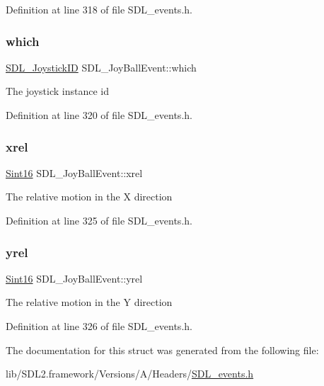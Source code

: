 Definition at line 318 of file S\+D\+L\+\_\+events.\+h.

\mbox{\label{struct_s_d_l___joy_ball_event_a4e2e185717d529167cd0bea21093c454}} 
\subsubsection{\texorpdfstring{which}{which}}
{\footnotesize\ttfamily \mbox{\hyperlink{_s_d_l__joystick_8h_a3c3d32500cb08f76ee8077983912c0bd}{S\+D\+L\+\_\+\+Joystick\+ID}} S\+D\+L\+\_\+\+Joy\+Ball\+Event\+::which}

The joystick instance id 

Definition at line 320 of file S\+D\+L\+\_\+events.\+h.

\mbox{\label{struct_s_d_l___joy_ball_event_a959a8473aa1964e5e1778c27a9ffd261}} 
\subsubsection{\texorpdfstring{xrel}{xrel}}
{\footnotesize\ttfamily \mbox{\hyperlink{_s_d_l__stdinc_8h_a9d0257032c0e146ab6121bf0122712f5}{Sint16}} S\+D\+L\+\_\+\+Joy\+Ball\+Event\+::xrel}

The relative motion in the X direction 

Definition at line 325 of file S\+D\+L\+\_\+events.\+h.

\mbox{\label{struct_s_d_l___joy_ball_event_a28ad48a9eb7a5d3ff62ccba09fcead76}} 
\subsubsection{\texorpdfstring{yrel}{yrel}}
{\footnotesize\ttfamily \mbox{\hyperlink{_s_d_l__stdinc_8h_a9d0257032c0e146ab6121bf0122712f5}{Sint16}} S\+D\+L\+\_\+\+Joy\+Ball\+Event\+::yrel}

The relative motion in the Y direction 

Definition at line 326 of file S\+D\+L\+\_\+events.\+h.



The documentation for this struct was generated from the following file\+:\begin{DoxyCompactItemize}
\item 
lib/\+S\+D\+L2.\+framework/\+Versions/\+A/\+Headers/\mbox{\hyperlink{_s_d_l__events_8h}{S\+D\+L\+\_\+events.\+h}}\end{DoxyCompactItemize}
